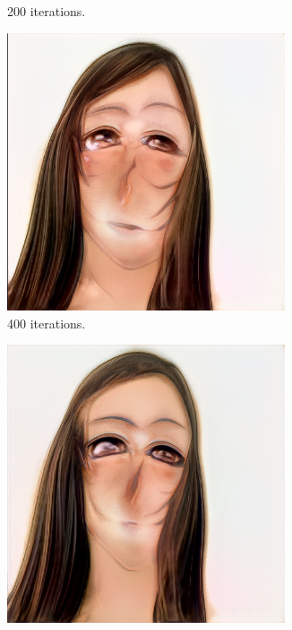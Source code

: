 \documentclass[conference]{IEEEtran}
\theoremstyle{definition}
\theoremstyle{remark}
\theoremstyle{remark}
\begin{document}
\begin{figure}
\begin{subfigure}[b]{0.15\textwidth}
    \caption{200 iterations.}
  \end{subfigure}
  \begin{subfigure}[b]{0.15\textwidth}
    \centering \includegraphics[width=0.9\textwidth]{figs/anime-olga-2.png}
    \caption{400 iterations.}
  \end{subfigure}
  \begin{subfigure}[b]{0.15\textwidth}
    \centering \includegraphics[width=0.9\textwidth]{figs/anime-olga-3.png}

\end{subfigure}
\end{figure}
\end{document}
